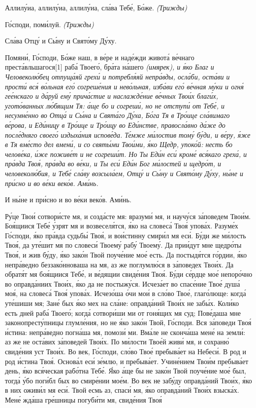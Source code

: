    Аллилу́иа, аллилу́иа, аллилу́иа, сла́ва Тебе́, Бо́же. \itshape (Трижды)\normalfont{}


   Го́споди, поми́луй. \itshape (Трижды)\normalfont{}


   Сла́ва Отцу́ и Сы́ну и Свято́му Ду́ху.



   Помяни́, Го́споди, Бо́же наш, в ве́ре и наде́жди живота́ ве́чнаго
преста́вльшагося[1]
раба́ Твоего́, бра́та на́шего \itshape (имярек)\normalfont{}, и я́ко Благ и Человеколю́бец
отпуща́яй грехи́ и потребля́яй непра́вды, осла́би, оста́ви и прости́ вся́
во́льная его́ согреше́ния и нево́льная, изба́ви его́ ве́чная му́ки и огня́
гее́нскаго и да́руй ему́ прича́стие и наслажде́ние ве́чных Твои́х благи́х,
угото́ванных лю́бящим Тя: а́ще бо и согреши́, но не отступи́ от Тебе́, и
несумне́нно во Отца́ и Сы́на и Свята́го Ду́ха, Бо́га Тя в Тро́ице сла́вимаго
ве́рова, и Еди́ницу в Тро́ице и Тро́ицу во Еди́нстве, правосла́вно да́же
до после́дняго своего́ издыха́ния испове́да. Те́мже ми́лостив тому́
бу́ди, и ве́ру, я́же в Тя вме́сто дел вмени́, и со святы́ми Твои́ми, я́ко
Щедр, упоко́й: несть бо челове́ка, и́же поживе́т и не согреши́т. Но Ты
Еди́н еси́ кроме́ вся́каго греха́, и пра́вда Твоя́, пра́вда во ве́ки, и Ты
еси́ Еди́н Бог ми́лостей и щедро́т, и человеколю́бия, и Тебе́ сла́ву
возсыла́ем, Отцу́ и Сы́ну и Свято́му Ду́ху, ны́не и при́сно и во ве́ки веко́в.
Ами́нь.


   И ны́не и при́сно и во ве́ки веко́в. Ами́нь.
   


   Ру́це Твои́ сотвори́сте мя, и созда́сте мя: вразуми́ мя, и научу́ся за́поведем
Твои́м. Боя́щиися Тебе́ у́зрят мя и возвеселя́тся, я́ко на словеса́ Твоя́ упова́х.
Разуме́х Го́споди, я́ко пра́вда судьбы́ Твоя́, и вои́стинну смири́л мя еси́. Бу́ди
же ми́лость Твоя́, да уте́шит мя по словеси́ Твоему́ рабу́ Твоему́. Да прии́дут
мне щедро́ты Твоя́, и жив бу́ду, я́ко зако́н Твой поуче́ние мое́ есть. Да
постыдя́тся го́рдии, я́ко непра́ведно беззако́нноваша на мя, аз же
поглумлю́ся в за́поведех Твои́х. Да обратя́т мя боя́щиися Тебе́, и ве́дящии
свиде́ния Твоя́. Бу́ди се́рдце мое́ непоро́чно во оправда́ниих Твои́х, я́ко да не
постыжу́ся. Исчеза́ет во спасе́ние Твое́ душа́ моя́, на словеса́ Твоя́ упова́х.
Исчезо́ша о́чи мои́ в сло́во Твое́, глаго́люще: когда́ уте́шиши мя; Зане́ бых
я́ко мех на сла́не: оправда́ний Твои́х не забы́х. Коли́ко есть дней
раба́ Твоего́; когда́ сотвори́ши ми от гоня́щих мя суд; Пове́даша мне
законопресту́пницы глумле́ния, но не я́ко зако́н Твой, Го́споди. Вся
за́поведи Твоя́ и́стина: непра́ведно погна́ша мя, помози́ ми. Вма́ле не
сконча́ша мене́ на земли́: аз же не оста́вих за́поведей Твои́х. По ми́лости
Твое́й живи́ мя, и сохраню́ свиде́ния уст Твои́х. Во век, Го́споди, сло́во
Твое́ пребыва́ет на Небеси́. В род и род и́стина Твоя́. Основа́л еси́
зе́млю, и пребыва́ет. Учине́нием Твои́м пребыва́ет день, я́ко вся́ческая
рабо́тна Тебе́. Я́ко а́ще бы не зако́н Твой поуче́ние мое́ был, тогда́ у́бо
поги́бл бых во смире́нии мое́м. Во век не забу́ду оправда́ний Твои́х,
я́ко в них оживи́л мя еси́. Твой есмь аз, спаси́ мя, я́ко оправда́ний
Твои́х взыска́х. Мене́ жда́ша гре́шницы погуби́ти мя, свиде́ния Твоя́

